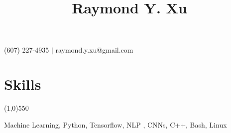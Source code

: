 \documentclass[11pt]{article} %
\title{\vspace{-6ex} \Huge Raymond Y. Xu \vspace{-4ex}}
\author{}
\date{} %
\begin{document}
	\maketitle
	\vspace{-3ex}
	\begin{center}
		(607) 227-4935 $|$ raymond.y.xu@gmail.com\\
		 \vspace{-3ex}
	\end{center}
	\section*{Skills}
	\vspace{-7ex}
	\begin{center}
    \line(1,0){550}
    \end{center} \vspace{-1ex}
    Machine Learning, Python, Tensorflow, NLP , CNNs, C++, Bash, Linux 
	\vspace{-2ex}
\end{document}
